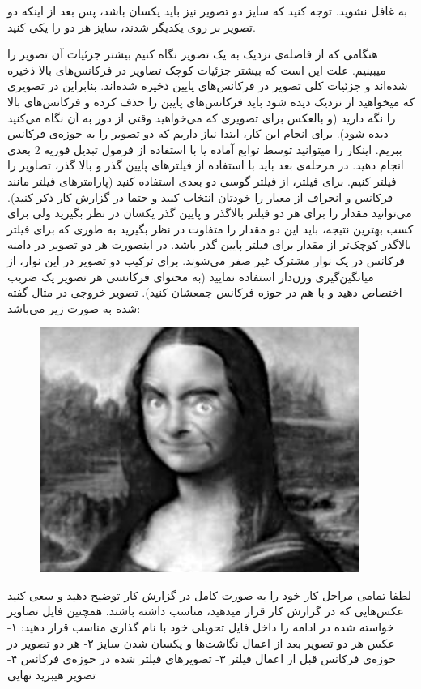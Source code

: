 \documentclass[a4paper]{article}
\begin{document}
به 
غافل نشوید. توجه کنید که سایز دو تصویر نیز باید یکسان باشد، پس بعد از اینکه دو تصویر بر روی یکدیگر 
شدند، سایز هر دو را یکی کنید.

هنگامی که از فاصله‌ی نزدیک به یک تصویر نگاه کنیم بیشتر جزئيات آن تصویر را میبینیم. علت این است که بیشتر جزئیات کوچک تصاویر در فرکانس‌های بالا ذخیره شده‌اند و جزئیات کلی تصویر در فرکانس‌های پایین ذخیره شده‌اند. بنابراین در تصویری که میخواهید از نزدیک دیده شود باید فرکانس‌های پایین را حذف کرده و فرکانس‌های بالا را نگه دارید (و بالعکس برای تصویری که می‌خواهید وقتی از دور به آن نگاه می‌کنید دیده شود). برای انجام این کار، ابتدا نیاز داریم که دو تصویر را به حوزه‌ی فرکانس ببریم. اینکار را میتوانید توسط توابع آماده‌ یا با استفاده از فرمول تبدیل فوریه $ 2 $ بعدی انجام دهید. در مرحله‌ی بعد باید با استفاده از فیلتر‌های پایین گذر و بالا گذر، تصاویر را فیلتر کنیم. برای فیلتر، از فیلتر گوسی دو بعدی استفاده کنید (پارامتر‌های فیلتر مانند فرکانس
و انحراف از معیار را خودتان انتخاب کنید و حتما در گزارش کار ذکر کنید). می‌توانید مقدار 
 را برای هر دو فیلتر بالاگذر و پایین گذر یکسان در نظر بگیرید ولی برای کسب بهترین نتیجه، باید این دو مقدار را متفاوت در نظر بگیرید به طوری که
   برای فیلتر بالاگذر کوچک‌تر از مقدار برای فیلتر پایین گذر باشد. در اینصورت هر دو تصویر در دامنه فرکانس در یک نوار مشترک غیر صفر می‌شوند. برای ترکیب دو تصویر در این نوار، از میانگین‌گیری وزن‌دار استفاده نمایید (به محتوای فرکانسی هر تصویر یک ضریب اختصاص دهید و با هم در حوزه فرکانس جمعشان کنید).
تصویر خروجی در مثال گفته شده به صورت زیر می‌باشد:
\begin{figure}[H]
	\centering
	\includegraphics[width=0.3 \linewidth]{images/Picture12.png}
\end{figure}
\newpage
لطفا تمامی مراحل کار خود را به صورت کامل در گزارش کار توضیح دهید و سعی کنید عکس‌هایی که در گزارش کار قرار میدهید،  مناسب داشته باشند. همچنین فایل تصاویر خواسته شده در ادامه را داخل فایل تحویلی خود با نام گذاری مناسب قرار دهید:
۱- عکس هر دو تصویر بعد از اعمال نگاشت‌ها و یکسان شدن سایز‌ ۲- هر دو تصویر در حوزه‌ی فرکانس قبل از اعمال فیلتر ۳- تصویر‌های فیلتر شده در حوزه‌ی فرکانس ۴- تصویر هیبرید نهایی
\end{document}
